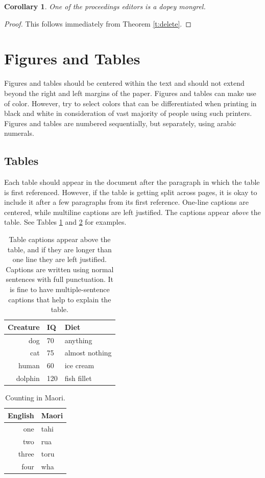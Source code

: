 \documentclass[a4paper,11pt]{article}
\theoremstyle{plain}
\newtheorem{corollary}{Corollary}
\theoremstyle{definition}
\begin{document}
\begin{corollary}
One of the proceedings editors is a dopey mongrel.
\end{corollary}
\begin{proof}
This follows immediately from Theorem \ref{t:delete}.
\end{proof}

\section{Figures and Tables}
\label{sec:graphics}
Figures and tables should be centered within the text and should not
extend beyond the right and left margins of the paper.
Figures and tables can make use of color.
However, try to select colors that can be differentiated when printing
in black and white in consideration of vast majority of people
using such printers.
Figures and tables are numbered sequentially, but separately,
using arabic numerals.

\subsection{Tables}
Each table should appear in the document after the paragraph in which the
table is first referenced. However, if the table is getting split across
pages, it is okay to include it after a few paragraphs from its first reference.
One-line captions are centered, while multiline captions are left justified.
The captions appear \textit{above} the table. See Tables \ref{tab:first} and
\ref{tab:second} for examples.

\begin{table}[H]
\caption{Table captions appear above the table, and if they are longer
than one line they are left justified. Captions are written using normal
sentences with full punctuation. It is fine to have multiple-sentence
captions that help to explain the table.}
\label{tab:first}
\medskip
\centering
\begin{tabular}{rll}
\hline
Creature & IQ & Diet\\ \hline
dog & 70 & anything\\
cat & 75 & almost nothing\\
human & 60 & ice cream \\
dolphin & 120 & fish fillet\\
\hline
\end{tabular}
\end{table}

\begin{table}[H]
\centering
\caption{Counting in Maori.}
\label{tab:second}
\medskip
\begin{tabular}{r|l}
English & Maori \\ \hline
one & tahi \\
two & rua \\
three & toru \\
four & wha \\
\hline
\end{tabular}
\end{table}
\end{document}
